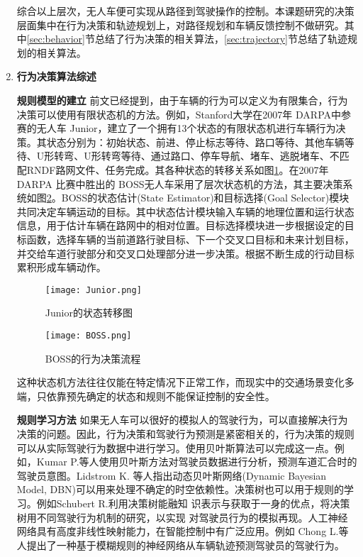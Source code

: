 \begin{enumerate}[wide=\parindent]
综合以上层次，无人车便可实现从路径到驾驶操作的控制。本课题研究的决策层面集中在行为决策和轨迹规划上，对路径规划和车辆反馈控制不做研究。其中\ref{sec:behavior}节总结了行为决策的相关算法，\ref{sec:trajectory}节总结了轨迹规划的相关算法。

\item \textbf{行为决策算法综述}
\label{sec:behavior}

\textbf{规则模型的建立 }
前文已经提到，由于车辆的行为可以定义为有限集合，行为决策可以使用有限状态机的方法。例如，Stanford大学在2007年 DARPA中参赛的无人车 Junior，建立了一个拥有13个状态的有限状态机进行车辆行为决策\cite{Montemerlo2008Junior}。其状态分别为：初始状态、前进、停止标志等待、路口等待、其他车辆等待、U形转弯、U形转弯等待、通过路口、停车导航、堵车、逃脱堵车、不匹配RNDF路网文件、任务完成。其各种状态的转移关系如图\ref{fig:junior}。在2007年 DARPA 比赛中胜出的 BOSS\cite{Baker2008Traffic}无人车采用了层次状态机的方法，其主要决策系统如图\ref{fig:boss}。BOSS的状态估计(State Estimator)和目标选择(Goal Selector)模块共同决定车辆运动的目标。其中状态估计模块输入车辆的地理位置和运行状态信息，用于估计车辆在路网中的相对位置。目标选择模块进一步根据设定的目标函数，选择车辆的当前道路行驶目标、下一个交叉口目标和未来计划目标，并交给车道行驶部分和交叉口处理部分进一步决策。根据不断生成的行动目标累积形成车辆动作。

\begin{figure}[htbp]
\centering
\texttt{[image: Junior.png]}
\caption[Junior的状态转移图]{Junior的状态转移图\cite{Montemerlo2008Junior}}
\label{fig:junior}
\end{figure}

\begin{figure}[htbp]
\centering
\texttt{[image: BOSS.png]}
\caption[BOSS的行为决策流程]{BOSS的行为决策流程\cite{Baker2008Traffic}}
\label{fig:boss}
\end{figure}

这种状态机方法往往仅能在特定情况下正常工作，而现实中的交通场景变化多端，只依靠预先确定的状态和规则不能保证控制的安全性。

\textbf{规则学习方法 }
如果无人车可以很好的模拟人的驾驶行为，可以直接解决行为决策的问题。因此，行为决策和驾驶行为预测是紧密相关的，行为决策的规则可以从实际驾驶行为数据中进行学习。使用贝叶斯算法可以完成这一点。例如，Kumar P.等人\cite{Kumar2013Learning}使用贝叶斯方法对驾驶员数据进行分析，预测车道汇合时的驾驶员意图。Lidstrom K. 等人\cite{Lidstrom2008Model}指出动态贝叶斯网络(Dynamic Bayesian Model, DBN)可以用来处理不确定的时空依赖性。决策树也可以用于规则的学习。例如Schubert R.\cite{Schubert2012Evaluating}利用决策树能融知 识表示与获取于一身的优点，将决策树用不同驾驶行为机制的研究，以实现 对驾驶员行为的模拟再现。人工神经网络具有高度非线性映射能力，在智能控制中有广泛应用。例如 Chong L.等人\cite{Chong2013A}提出了一种基于模糊规则的神经网络从车辆轨迹预测驾驶员的驾驶行为。


\end{enumerate}
